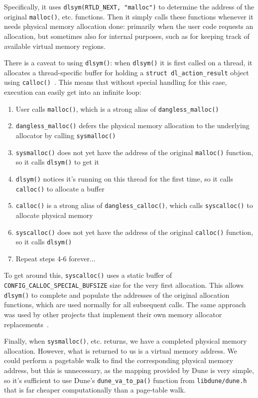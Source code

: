 Specifically, it uses \lstinline!dlsym(RTLD_NEXT, "malloc")! to determine the address of the original \lstinline!malloc()!, etc. functions. Then it simply calls these functions whenever it needs physical memory allocation done: primarily when the user code requests an allocation, but sometimes also for internal purposes, such as for keeping track of available virtual memory regions.

There is a caveat to using \lstinline!dlsym()!: when \lstinline!dlsym()! it is first called on a thread, it allocates a thread-specific buffer for holding a \lstinline!struct dl_action_result! object using \lstinline!calloc()!~\cite{glibc-dlsym-calls-calloc}. This means that without special handling for this case, execution can easily get into an infinite loop:

\begin{enumerate}
	\item User calls \lstinline!malloc()!, which is a strong alias of \lstinline!dangless_malloc()!
	\item \lstinline!dangless_malloc()! defers the physical memory allocation to the underlying allocator by calling \lstinline!sysmalloc()!
	\item \lstinline!sysmalloc()! does not yet have the address of the original \lstinline!malloc()! function, so it calls \lstinline!dlsym()! to get it
	\item \lstinline!dlsym()! notices it's running on this thread for the first time, so it calls \lstinline!calloc()! to allocate a buffer
	\item \lstinline!calloc()! is a strong alias of \lstinline!dangless_calloc()!, which calls \lstinline!syscalloc()! to allocate physical memory
	\item \lstinline!syscalloc()! does not yet have the address of the original \lstinline!calloc()! function, so it calls \lstinline!dlsym()!
	\item Repeat steps 4-6 forever...
\end{enumerate}

To get around this, \lstinline!syscalloc()! uses a static buffer of \lstinline!CONFIG_CALLOC_SPECIAL_BUFSIZE! size for the very first allocation. This allows \lstinline!dlsym()! to complete and populate the addresses of the original allocation functions, which are used normally for all subsequent calls. The same approach was used by other projects that implement their own memory allocator replacements~\cite{dlsym-calloc-special-ex1}.

Finally, when \lstinline!sysmalloc()!, etc. returns, we have a completed physical memory allocation. However, what is returned to us is a virtual memory address. We could perform a pagetable walk to find the corresponding physical memory address, but this is unnecessary, as the mapping provided by Dune is very simple, so it's sufficient to use Dune's \lstinline!dune_va_to_pa()! function from \texttt{libdune/dune.h} that is far cheaper computationally than a page-table walk.

